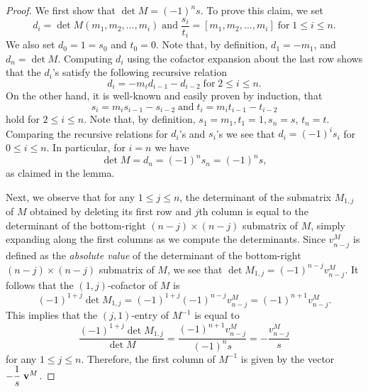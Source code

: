 \documentclass[11pt]{amsart}
\theoremstyle{plain}
\theoremstyle{definition}
\theoremstyle{remark}
\numberwithin{theorem}{section}
\begin{document}
\begin{proof} We first show that $\det M = (-1)^n s$. To prove this claim, we set 
\[
d_i = \det M(m_1, m_2, \dots, m_i) \; \mbox{and} \; \frac{s_i}{t_i} = [m_1, m_2, \dots, m_i] \; \mbox{for}\; 1 \leq i \leq n.
\]
We also set  $d_0=1=s_0$ and $t_0=0$. Note that, by definition, $d_1=-m_1$, and $d_n=\det M$. Computing $d_i$ using the cofactor expansion about the last row shows that the $d_i$'s satisfy the  following recursive relation 
\[
d_i=-m_id_{i-1}-d_{i-2} \; \mbox{for}\; 2 \leq i \leq n.
\] 
On the other hand, it is well-known and easily proven by induction, that 
\[
s_i =m_i s_{i-1}-s_{i-2} \; \mbox{and}\; t_i =m_i t_{i-1}-t_{i-2} 
\] 
hold for $ 2 \leq i \leq n$. Note that, by definition, $s_1=m_1, t_1=1, s_n=s$, $t_n=t$. Comparing the recursive relations for $d_i$'s and $s_i$'s we see that $d_i = (-1)^i s_i$ for $ 0 \leq i \leq n$. In particular, for $i=n$ we have 
$$
\det M=d_n= (-1)^n s_n=  (-1)^n s,
$$ 
as claimed in the lemma.  

Next, we observe that for any $1 \leq j \leq n$,  the determinant of the submatrix $M_{1,j}$ of $M$ obtained by deleting its first row and $j$th column is equal to the determinant of the bottom-right $(n-j) \times (n-j)$ submatrix of $M$, simply expanding along the first columns as we compute the determinants. Since $v^M_{n-j}$ is defined as the {\em absolute value} of the determinant of the bottom-right $(n-j) \times (n-j)$ submatrix of $M$, we see that $\det M_{1,j}=(-1)^{n-j} v^M_{n-j}.$ It follows that the  
  $(1, j)$-cofactor of $M$ is $$(-1)^{1+j} \det M_{1,j}= (-1)^{1+j} (-1)^{n-j}v^M_{n-j}=(-1)^{n+1} v^M_{n-j}.$$ 
  This implies that  the $(j,1)$-entry of $M^{-1}$ is equal to $$\frac{(-1)^{1+j} \det M_{1,j}} {\det M} = \frac{(-1)^{n+1} v^M_{n-j}}{(-1)^n s}=-\frac{v^M_{n-j}}{s}$$  for any $1 \leq j \leq n$. Therefore, the first column of $M^{-1}$ is given by the vector  $-\dfrac{1}{s}   \; {\bf v}^M$. 
  

\end{proof}
\end{document}
